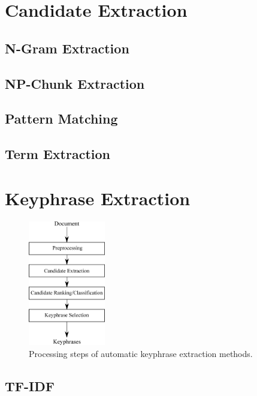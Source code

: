 
\section{Candidate Extraction}
\label{sec:candidate_extraction}

  \subsection{N-Gram Extraction}
  \label{subsec:n_gram_extraction}
  \subsection{NP-Chunk Extraction}
  \label{subsec:np_chunk_extraction}
  \subsection{Pattern Matching}
  \label{subsec:pattern_matching}
  \subsection{Term Extraction}
  \label{subsec:term_extraction}

\section{Keyphrase Extraction}
\label{sec:keyphrase_extraction}
  \begin{figure}
    \centering
    \includegraphics[width=0.3\textwidth]{include/processing_steps.eps}
    \caption{Processing steps of automatic keyphrase extraction methods.
             \label{fig:processing_steps}}
  \end{figure}

  \subsection{TF-IDF}
  \label{subsec:tfidf}
